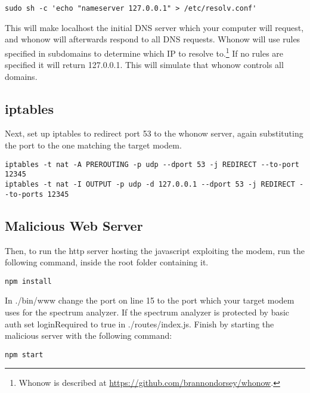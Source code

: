 \begin{lstlisting}[numbers=none]
sudo sh -c 'echo "nameserver 127.0.0.1" > /etc/resolv.conf'
\end{lstlisting}
This will make localhost the initial DNS server which your computer will request, and whonow will afterwards respond to all DNS requests.
Whonow will use rules specified in subdomains to determine which IP to resolve to.\footnote{Whonow is described at \url{https://github.com/brannondorsey/whonow}.}
If no rules are specified it will return 127.0.0.1. 
This will simulate that whonow controls all domains.

\subsection{iptables}
Next, set up iptables to redirect port 53 to the whonow server, again substituting the port to the one matching the target modem.

\begin{lstlisting}[numbers=none]
iptables -t nat -A PREROUTING -p udp --dport 53 -j REDIRECT --to-port 12345
iptables -t nat -I OUTPUT -p udp -d 127.0.0.1 --dport 53 -j REDIRECT --to-ports 12345
\end{lstlisting}

\subsection{Malicious Web Server}
Then, to run the http server hosting the javascript exploiting the modem, run the following command, inside the root folder containing it.
\begin{lstlisting}[numbers=none]
npm install
\end{lstlisting}

In ./bin/www change the port on line 15 to the port which your target modem uses for the spectrum analyzer. 
If the spectrum analyzer is protected by basic auth set loginRequired to true in ./routes/index.js.
Finish by starting the malicious server with the following command:
\begin{lstlisting}[numbers=none]
npm start
\end{lstlisting}


